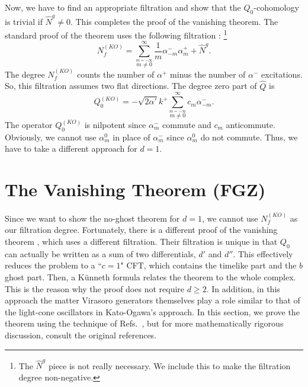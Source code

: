 \documentclass[a4paper,12pt]{article}
\newcommand{\hN}{\hat{N}^g}
\newcommand{\hQ}{\hat{Q}}
\begin{document}
Now, we have to find
an appropriate filtration and show that the $Q_0$-cohomology is trivial
if $\hN \neq 0$.
This completes the proof of the vanishing theorem.
The standard proof of the theorem  uses the
following filtration \cite{KO,BMP}:
\footnote{The $\hN$ piece is not really necessary.
We include this to make the filtration degree non-negative.}
\begin{equation}
%
N^{(KO)}_{f} = \sum_{\stackrel{\scriptstyle m=-\infty}{m \neq 0}}^{\infty}
        \frac{1}{m} \alpha^{-}_{-m} \alpha^{+}_{m} + \hN.
\label{eq:Nko}
%
\end{equation}
The degree $N^{(KO)}_{f}$ counts the number of $\alpha^+$ minus the number of
$\alpha^-$
excitations. So, this filtration assumes two flat directions.
The degree zero
part of $\hQ$ is
\begin{equation}
%
Q^{(KO)}_{0} = -\sqrt{2 \alpha'} k^{+}
        \sum_{\stackrel{\scriptstyle m=-\infty}{m \neq 0}}^{\infty}
        c_{m} \alpha^{-}_{-m}.
%
\end{equation}
The operator $Q^{(KO)}_{0}$ is nilpotent since $\alpha^{-}_{m}$ commute and
$c_{m}$ anticommute. Obviously, we cannot use $\alpha^{0}_{m}$ in place of
$\alpha^{-}_{m}$
since $\alpha^{0}_{m}$ do not commute. Thus,
we have to take a different approach for $d=1$.



\section{The Vanishing Theorem (FGZ)}\label{sec:fgz}

Since we want to show the no-ghost theorem for $d=1$, we cannot use $
N^{(KO)}_{f} $ as our filtration degree. Fortunately, there is a different
proof of the vanishing theorem \cite{FGZ,LZ,FK}, which uses a different
filtration.
Their filtration is unique in that $Q_0$ can actually be written as a sum of
two differentials, $d'$ and $d''$. This effectively reduces the problem to a
``$c=1$" CFT, which contains the timelike part and the $b$ ghost part. Then,
a K\"{u}nneth formula relates the theorem to the whole complex.
This is the reason why the proof does not require $d \geq 2$.
In addition, in this approach the
matter Virasoro generators themselves play a role similar to that of the
light-cone oscillators in Kato-Ogawa's approach. In this section, we 
prove the theorem using the technique of
Refs.~\cite{FGZ,LZ,FK}, but for more
mathematically rigorous discussion,
consult the original references.
\end{document}
